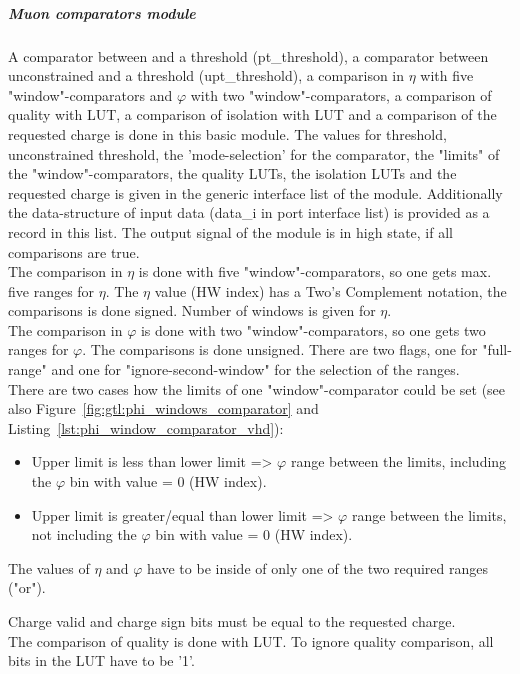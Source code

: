 \subparagraph{Muon comparators module}\label{sec:gtl:muon_comp_module}
A comparator between \pt and a threshold (pt\_threshold), a comparator between unconstrained \pt and a threshold (upt\_threshold), a comparison in $\eta$ with five "window"-comparators and $\varphi$ with two "window"-comparators, a comparison of quality with LUT, a comparison of isolation with LUT and a comparison of the requested charge is done in this basic module. The values for \pt threshold, unconstrained \pt threshold, the 'mode-selection' for the \pt comparator, the "limits" of the "window"-comparators, the quality LUTs, the isolation LUTs and the requested charge is given in the generic interface list of the module.
Additionally the data-structure of input data (data\_i in port interface list) is provided as a record in this list. The output signal of the module is in high state, if all comparisons are true.\\
The comparison in $\eta$ is done with five "window"-comparators, so one gets max. five ranges for $\eta$. The $\eta$ value (HW index) has a Two's Complement notation, the comparisons is done signed. Number of windows is given for $\eta$.\\
The comparison in $\varphi$ is done with two "window"-comparators, so one gets two ranges for $\varphi$. The comparisons is done unsigned. There are two flags, one for "full-range" and one for "ignore-second-window" for the selection of the ranges.\\
There are two cases how the limits of one "window"-comparator could be set (see also Figure~\ref{fig:gtl:phi_windows_comparator} and Listing~\ref{lst:phi_window_comparator_vhd}):
\begin{itemize}
\item Upper limit is less than lower limit => $\varphi$ range between the limits, including the $\varphi$ bin with value = 0 (HW index).
\item Upper limit is greater/equal than lower limit => $\varphi$ range between the limits, not including the $\varphi$ bin with value = 0 (HW index).
\end{itemize}

The values of $\eta$ and $\varphi$ have to be inside of only one of the two required ranges ("or").

Charge valid and charge sign bits must be equal to the requested charge.\\
The comparison of quality is done with LUT. To ignore quality comparison, all bits in the LUT have to be '1'.\\

